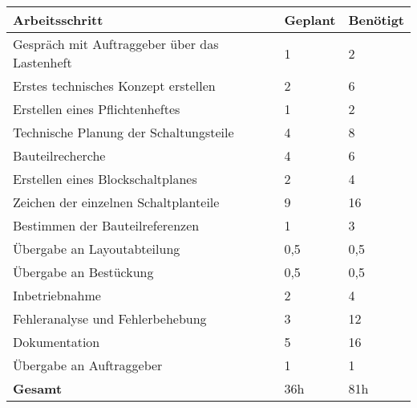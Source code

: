 \begin{tabularx}{\textwidth}{p{}|  p{} | p{}}

\textbf{Arbeitsschritt} 	&	\textbf{Geplant}	&	\textbf{Benötigt}	\\

\hline

Gespräch mit Auftraggeber über das Lastenheft	&	1	&	2\\

\hline

Erstes technisches Konzept erstellen			&	2	&	6\\

\hline

Erstellen eines Pflichtenheftes					&	1	&	2\\

\hline 

Technische Planung der Schaltungsteile			&	4	&	8\\

\hline 

Bauteilrecherche  								&	4	&	6\\

\hline
\hline

Erstellen eines Blockschaltplanes				&	2	&	4\\

\hline

Zeichen der einzelnen Schaltplanteile			&	9	&	16\\

\hline 

Bestimmen der Bauteilreferenzen					&	1	&	3\\

\hline

Übergabe an Layoutabteilung						&	0,5	&	0,5\\

\hline

Übergabe an Bestückung							&	0,5	&	0,5\\

\hline
\hline

Inbetriebnahme									&	2	&	4\\

\hline

Fehleranalyse und Fehlerbehebung				&	3	&	12\\

\hline 

Dokumentation									&	5	&	16\\

\hline

Übergabe an Auftraggeber						&	1	&	1\\

\hline
\hline

\textbf{Gesamt}	&	36h		&	81h

\end{tabularx}
\renewcommand{\arraystretch}{1}